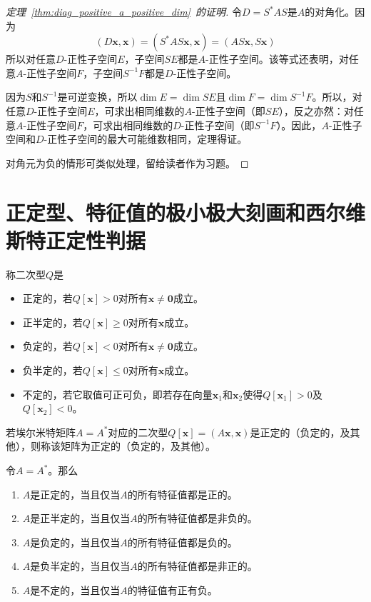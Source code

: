 \begin{proof}[定理~\ref{thm:diag_positive_a_positive_dim}~的证明]
    令$D=S^*AS$是$A$的对角化。因为
    \[(D\mathbf{x},\mathbf{x})=(S^*AS\mathbf{x},\mathbf{x})=(AS\mathbf{x},S\mathbf{x})\]
    所以对任意$D$-正性子空间$E$，子空间$SE$都是$A$-正性子空间。该等式还表明，对任意$A$-正性子空间$F$，子空间$S^{-1}F$都是$D$-正性子空间。

    因为$S$和$S^{-1}$是可逆变换，所以$\dim E=\dim SE$且$\dim F=\dim S^{-1}F$。所以，对任意$D$-正性子空间$E$，可求出相同维数的$A$-正性子空间（即$SE$），反之亦然：对任意$A$-正性子空间$F$，可求出相同维数的$D$-正性子空间（即$S^{-1}F$）。因此，$A$-正性子空间和$D$-正性子空间的最大可能维数相同，定理得证。

    对角元为负的情形可类似处理，留给读者作为习题。
\end{proof}

\section{正定型、特征值的极小极大刻画和西尔维斯特正定性判据}

\begin{definition*}
  称二次型$Q$是
  \begin{itemize}
    \item 正定的，若$Q[\mathbf{x}]>0$对所有$\mathbf{x}\ne\mathbf{0}$成立。
    \item 正半定的，若$Q[\mathbf{x}]\ge 0$对所有$\mathbf{x}$成立。
    \item 负定的，若$Q[\mathbf{x}]<0$对所有$\mathbf{x}\ne\mathbf{0}$成立。
    \item 负半定的，若$Q[\mathbf{x}]\le 0$对所有$\mathbf{x}$成立。
    \item 不定的，若它取值可正可负，即若存在向量$\mathbf{x}_1$和$\mathbf{x}_2$使得$Q[\mathbf{x}_1]>0$及$Q[\mathbf{x}_2]<0$。
  \end{itemize}
\end{definition*}

\begin{definition*}
  若埃尔米特矩阵$A=A^*$对应的二次型$Q[\mathbf{x}]=(A\mathbf{x},\mathbf{x})$是正定的（负定的，及其他），则称该矩阵为正定的（负定的，及其他）。
\end{definition*}

\begin{theorem}\label{thm:pd_eig_pos}
  令$A=A^*$。那么
  \begin{enumerate}
    \item $A$是正定的，当且仅当$A$的所有特征值都是正的。
    \item $A$是正半定的，当且仅当$A$的所有特征值都是非负的。
    \item $A$是负定的，当且仅当$A$的所有特征值都是负的。
    \item $A$是负半定的，当且仅当$A$的所有特征值都是非正的。
    \item $A$是不定的，当且仅当$A$的特征值有正有负。
  \end{enumerate}
\end{theorem}

